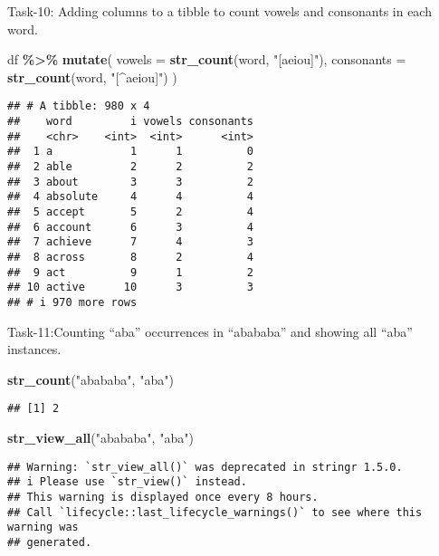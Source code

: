 \documentclass[
]{article}
\newenvironment{Shaded}{\begin{snugshade}}{\end{snugshade}}
\newcommand{\AttributeTok}[1]{\textcolor[rgb]{0.13,0.29,0.53}{#1}}
\newcommand{\FunctionTok}[1]{\textcolor[rgb]{0.13,0.29,0.53}{\textbf{#1}}}
\newcommand{\NormalTok}[1]{#1}
\newcommand{\SpecialCharTok}[1]{\textcolor[rgb]{0.81,0.36,0.00}{\textbf{#1}}}
\newcommand{\StringTok}[1]{\textcolor[rgb]{0.31,0.60,0.02}{#1}}
\begin{document}
Task-10: Adding columns to a tibble to count vowels and consonants in
each word.

\begin{Shaded}
\begin{Highlighting}[]
\NormalTok{df }\SpecialCharTok{\%\textgreater{}\%} 
  \FunctionTok{mutate}\NormalTok{(}
    \AttributeTok{vowels =} \FunctionTok{str\_count}\NormalTok{(word, }\StringTok{"[aeiou]"}\NormalTok{),}
    \AttributeTok{consonants =} \FunctionTok{str\_count}\NormalTok{(word, }\StringTok{"[\^{}aeiou]"}\NormalTok{)}
\NormalTok{  )}
\end{Highlighting}
\end{Shaded}

\begin{verbatim}
## # A tibble: 980 x 4
##    word         i vowels consonants
##    <chr>    <int>  <int>      <int>
##  1 a            1      1          0
##  2 able         2      2          2
##  3 about        3      3          2
##  4 absolute     4      4          4
##  5 accept       5      2          4
##  6 account      6      3          4
##  7 achieve      7      4          3
##  8 across       8      2          4
##  9 act          9      1          2
## 10 active      10      3          3
## # i 970 more rows
\end{verbatim}

Task-11:Counting ``aba'' occurrences in ``abababa'' and showing all
``aba'' instances.

\begin{Shaded}
\begin{Highlighting}[]
\FunctionTok{str\_count}\NormalTok{(}\StringTok{"abababa"}\NormalTok{, }\StringTok{"aba"}\NormalTok{)}
\end{Highlighting}
\end{Shaded}

\begin{verbatim}
## [1] 2
\end{verbatim}

\begin{Shaded}
\begin{Highlighting}[]
\FunctionTok{str\_view\_all}\NormalTok{(}\StringTok{"abababa"}\NormalTok{, }\StringTok{"aba"}\NormalTok{)}
\end{Highlighting}
\end{Shaded}

\begin{verbatim}
## Warning: `str_view_all()` was deprecated in stringr 1.5.0.
## i Please use `str_view()` instead.
## This warning is displayed once every 8 hours.
## Call `lifecycle::last_lifecycle_warnings()` to see where this warning was
## generated.
\end{verbatim}
\end{document}
